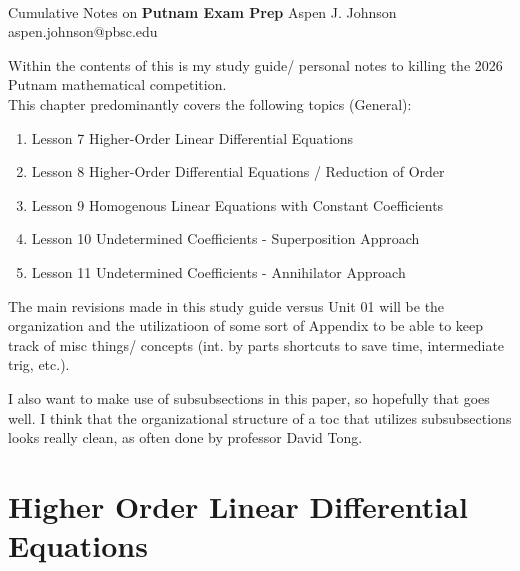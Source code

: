 \documentclass[10pt]{article}
\begin{document}
\thispagestyle{empty}
\bigskip \
\vspace{0.1cm}

\begin{center}
{\fontsize{22}{22} \selectfont Cumulative Notes on}
\vskip 16pt
{\fontsize{25}{25} \selectfont \bf {} Putnam Exam Prep}
\vskip 24pt
{\fontsize{18}{18} \selectfont \rmfamily Aspen J. Johnson} 
\vskip 6pt
{\fontsize{14}{14} \selectfont \ttfamily aspen.johnson@pbsc.edu} 
\vskip 24pt
\end{center}

{\parindent0pt \baselineskip=15.5pt }

Within the contents of this is my study guide/ personal notes to killing the 2026 Putnam mathematical competition. \\

This chapter predominantly covers the following topics (General):

\begin{enumerate}
    \item Lesson 7 Higher-Order Linear Differential Equations
    \item Lesson 8 Higher-Order Differential Equations / Reduction of Order
    \item Lesson 9 Homogenous Linear Equations with Constant Coefficients
    \item  Lesson 10 Undetermined Coefficients - Superposition Approach
    \item Lesson 11 Undetermined Coefficients - Annihilator Approach
\end{enumerate} 

The main revisions made in this study guide versus Unit 01 will be the organization and the utilizatioon of some sort of Appendix to be able to 
keep track of misc things/ concepts (int. by parts shortcuts to save time, intermediate trig, etc.).

I also want to make use of subsubsections in this paper, so hopefully that goes well. I think that the organizational structure of a toc that utilizes
subsubsections looks really clean, as often done by professor David Tong. 

\microtoc

\section{Higher Order Linear Differential Equations}
\end{document}
